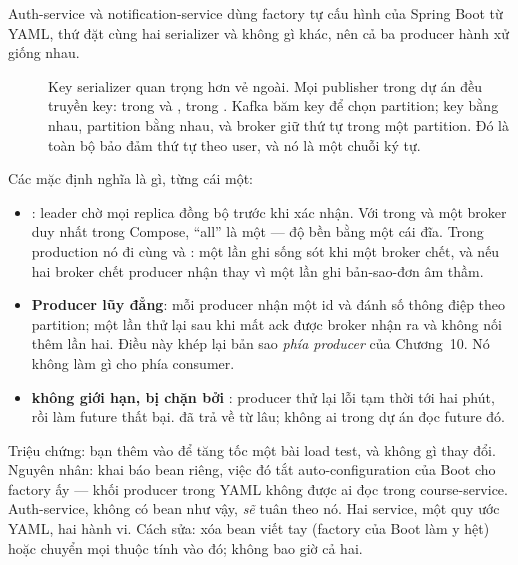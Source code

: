 Auth-service và notification-service dùng factory tự cấu hình của
Spring Boot từ YAML, thứ đặt cùng hai serializer và không gì khác, nên
cả ba producer hành xử giống nhau.

\begin{description}
  \item[] Key serializer quan trọng hơn vẻ ngoài. Mọi publisher
  trong dự án đều truyền key:  trong
   và ,
   trong . Kafka
  băm key để chọn partition; key bằng nhau, partition bằng nhau, và
  broker giữ thứ tự trong một partition. Đó là toàn bộ bảo đảm thứ tự
  theo user, và nó là một chuỗi ký tự.
\end{description}

Các mặc định nghĩa là gì, từng cái một:

\begin{itemize}
  \item \textbf{}: leader chờ mọi replica đồng bộ trước
  khi xác nhận. Với  trong  và
  một broker duy nhất trong Compose, ``all'' là một --- độ bền bằng một
  cái đĩa. Trong production nó đi cùng  và
  : một lần ghi sống sót khi một broker
  chết, và nếu hai broker chết producer nhận 
  thay vì một lần ghi bản-sao-đơn âm thầm.
  \item \textbf{Producer lũy đẳng}: mỗi producer nhận một id và đánh số
  thông điệp theo partition; một lần thử lại sau khi mất ack được broker
  nhận ra và không nối thêm lần hai. Điều này khép lại bản sao \emph{phía
  producer} của Chương~10. Nó không làm gì cho phía consumer.
  \item \textbf{ không giới hạn, bị chặn bởi
  }: producer thử lại lỗi tạm thời tới hai
  phút, rồi làm future thất bại.  đã trả về từ lâu; không
  ai trong dự án đọc future đó.
\end{itemize}

\begin{pitfall}
Triệu chứng: bạn thêm  vào
 để tăng tốc một bài load test, và không gì
thay đổi. Nguyên nhân:  khai báo bean
 riêng, việc đó tắt auto-configuration của Boot
cho factory ấy --- khối producer trong YAML không được ai đọc trong
course-service. Auth-service, không có bean như vậy, \emph{sẽ} tuân
theo nó. Hai service, một quy ước YAML, hai hành vi. Cách sửa: xóa bean
viết tay (factory của Boot làm y hệt) hoặc chuyển mọi thuộc tính vào
đó; không bao giờ cả hai.
\end{pitfall}

